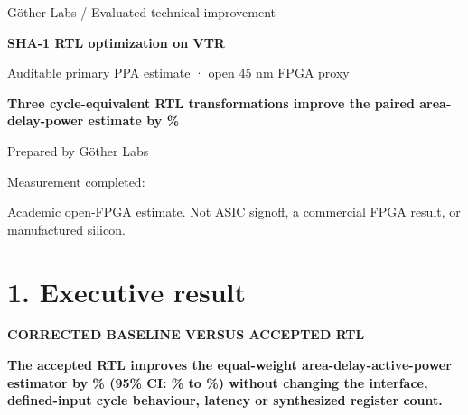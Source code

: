\documentclass[10pt,a4paper]{article}
\newcommand{\smallcaps}[1]{\textcolor{Mid}{\fontsize{8.5}{10}\selectfont\bfseries\MakeUppercase{#1}}}
\newcommand{\newpageheading}[2]{\clearpage\section{#1}\smallcaps{#2}\vspace{6pt}}
\begin{document}
\thispagestyle{empty}
\vspace*{47mm}
{\color{Mid}\fontsize{11}{14}\selectfont Göther Labs / Evaluated technical improvement}\par
\vspace{5mm}
{\color{Ink}\fontsize{29}{33}\selectfont\bfseries SHA-1 RTL optimization on VTR}\par
\vspace{5mm}
{\color{Mid}\fontsize{13}{16}\selectfont Auditable primary PPA estimate · open 45 nm FPGA proxy}\par
\vspace{19mm}
\begin{claimbox}
{\fontsize{15}{19}\selectfont\bfseries Three cycle-equivalent RTL transformations improve the paired area-delay-power estimate by \CompositeEstimate\%}
\end{claimbox}
\vspace{35mm}
{\color{Mid}\fontsize{12}{15}\selectfont Prepared by Göther Labs}\par
\vspace{4mm}
{\color{Mid}\fontsize{12}{15}\selectfont Measurement completed: \EvidenceDate}\par
\vfill
{\color{Mid}\footnotesize Academic open-FPGA estimate. Not ASIC signoff, a commercial FPGA result, or manufactured silicon.}\par

\newpageheading{1. Executive result}{Corrected baseline versus accepted RTL}

\begin{claimbox}
\textbf{The accepted RTL improves the equal-weight area-delay-active-power estimator by \CompositeEstimate\% (95\% CI: \CompositeLow\% to \CompositeHigh\%) without changing the interface, defined-input cycle behaviour, latency or synthesized register count.}
\end{claimbox}
\end{document}
